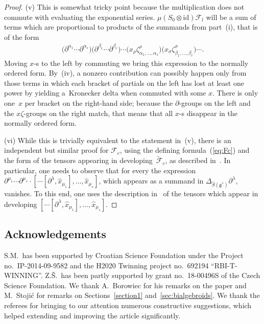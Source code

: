 \documentclass[10pt,a4paper]{amsart}
\def\gg{\mathfrak{g}}
\def\id{\mathrm{id}}
\numberwithin{equation}{section}
\begin{document}
\begin{proof}
(v) This is somewhat tricky point because the multiplication does not commute with eva\-luating the exponential series. $\mu(S_0\otimes\id)\mathcal{F}_l$ will be a sum of terms which are proportional to products of the summands from part~(i), that is of the form
\begin{gather*}\big(\partial^{\alpha_1}\cdots\partial^{\alpha_s}\big)\big(\partial^{\beta_1}\cdots\partial^{\beta_r}\big)\cdots \big(x_{\rho}\zeta^\rho_{\alpha_1,\dots,\alpha_s}\big)\big(x_{\sigma}\zeta^\sigma_{\beta_1,\dots,\beta_r}\big)\cdots.\end{gather*}
Moving $x$-s to the left by commuting we bring this expression to the normally ordered form. By~(iv), a nonzero contribution can possibly happen only from those terms in which each bracket of partials on the left has lost at least one power by yielding a~Kronecker delta when commuted with some $x$. There is only one~$x$ per bracket on the right-hand side; because the $\partial$-groups on the left and the $x\zeta$-groups on the right match, that means that all $x$-s disappear in the normally ordered form.

(vi) While this is trivially equivalent to the statement in~(v), there is an independent but similar proof for $\mathcal{F}_c$, using the defining formula~(\ref{eq:Fc}) and the form of the tensors appearing in developing~$\tilde{\mathcal{F}}_c$, as described in~\cite{scopr}. In particular, one needs to observe that for every  the expression $\partial^{\mu_1}\cdots\partial^{\mu_s}\cdot
[\cdots[\partial^\lambda,\hat{x}_{\mu_1}],\ldots,\hat{x}_{\mu_s}]$, which appears as a summand in $\Delta_{\hat{S}(\gg^*)}\partial^{\lambda}$, va\-ni\-shes. To this end, one uses the description in~\cite{scopr} of the tensors which appear in developing
$[\cdots[\partial^\lambda,\hat{x}_{\mu_1}],\dots,\hat{x}_{\mu_s}]$.
\end{proof}

\subsection*{Acknowledgements} S.M.~has been supported by Croatian Science Foundation under the Project no.~IP-2014-09-9582 and the H2020 Twinning project no.~692194 ``RBI-T-WINNING''. Z.\v{S}.~has been partly supported by grant no.~18-00496S of the Czech Science Foundation. We thank A.~Borowiec for his remarks on the paper and M.~Stoji\'c for remarks on Sections~\ref{section1} and~\ref{sec:bialgebroids}. We thank the referees for bringing to our attention numerous constructive suggestions, which helped extending and improving the article significantly.
\end{document}

